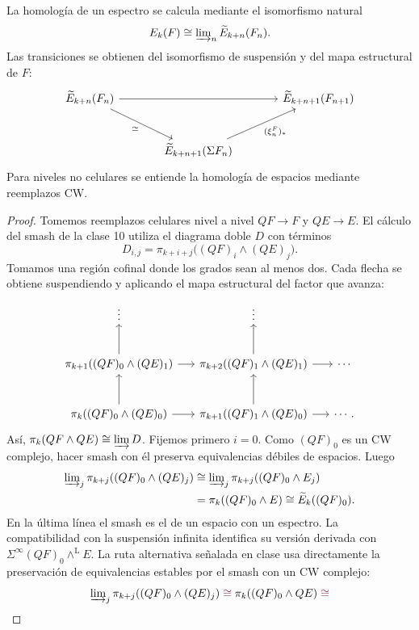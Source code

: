 \begin{prop}\label{prop:c19-homologia-niveles}
La homología de un espectro se calcula mediante el isomorfismo natural
\[
E_k(F)\cong\varinjlim\nolimits_n\widetilde E_{k+n}(F_n).
\]
Las transiciones se obtienen del isomorfismo de suspensión y del mapa estructural de $F$:
\[
\begin{tikzcd}[column sep=large,row sep=large]
\widetilde E_{k+n}(F_n)\arrow[rr]\arrow[dr,"\simeq"']
&&\widetilde E_{k+n+1}(F_{n+1})\\
&\widetilde E_{k+n+1}(\Sigma F_n)\arrow[ur,"(\xi^F_n)_*"']&
\end{tikzcd}
\]
Para niveles no celulares se entiende la homología de espacios mediante reemplazos CW.
\end{prop}
\begin{proof}
Tomemos reemplazos celulares nivel a nivel $QF\to F$ y $QE\to E$. El cálculo del smash de la clase 10 utiliza el diagrama doble $D$ con términos
\[
D_{i,j}=\pi_{k+i+j}\bigl((QF)_i\wedge(QE)_j\bigr).
\]
Tomamos una región cofinal donde los grados sean al menos dos. Cada flecha se obtiene suspendiendo y aplicando el mapa estructural del factor que avanza:
\[
\begin{tikzcd}[column sep=1.5em,row sep=large]
\vdots&\vdots&\\
\pi_{k+1}((QF)_0\wedge(QE)_1)\arrow[u]\arrow[r]
&\pi_{k+2}((QF)_1\wedge(QE)_1)\arrow[u]\arrow[r]&\cdots\\
\pi_k((QF)_0\wedge(QE)_0)\arrow[u]\arrow[r]
&\pi_{k+1}((QF)_1\wedge(QE)_0)\arrow[u]\arrow[r]&\cdots .
\end{tikzcd}
\]
Así, $\pi_k(QF\wedge QE)\cong\varinjlim D$. Fijemos primero $i=0$. Como $(QF)_0$ es un CW complejo, hacer smash con él preserva equivalencias débiles de espacios. Luego
\[
\begin{aligned}
\varinjlim\nolimits_j\pi_{k+j}((QF)_0\wedge(QE)_j)
&\cong\varinjlim\nolimits_j\pi_{k+j}((QF)_0\wedge E_j)\\
&=\pi_k((QF)_0\wedge E)
\cong\widetilde E_k((QF)_0).
\end{aligned}
\]
En la última línea el smash es el de un espacio con un espectro. La compatibilidad con la suspensión infinita identifica su versión derivada con $\Sigma^\infty(QF)_0\wedge^{\mathrm L}E$. La ruta alternativa señalada en clase usa directamente la preservación de equivalencias estables por el smash con un CW complejo:
\[
\varinjlim\nolimits_j\pi_{k+j}((QF)_0\wedge(QE)_j)
\mathrel{\mathop{\cong}^{\color{rojoDiagramaCIMAT}}}
\pi_k((QF)_0\wedge QE)
\mathrel{\mathop{\cong}^{\color{rojoDiagramaCIMAT}}}
\]
\end{proof}
